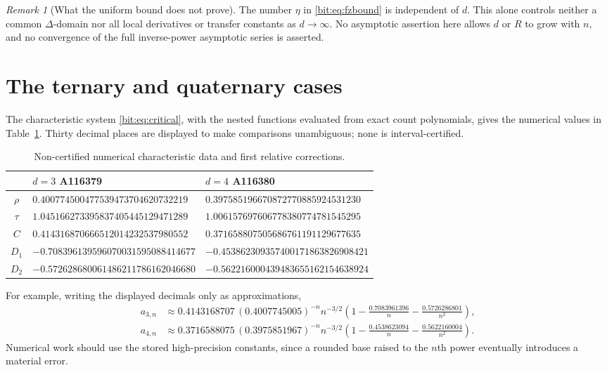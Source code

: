 \documentclass[11pt]{article}
\theoremstyle{definition}\newtheorem{definition}[theorem]{Definition}
\theoremstyle{remark}\newtheorem{remark}[theorem]{Remark}
\begin{document}
\begin{remark}[What the uniform bound does not prove]
The number $\eta$ in \eqref{bit:eq:fzbound} is independent of $d$. This alone controls neither a common $\Delta$-domain nor all local derivatives or transfer constants as $d\to\infty$. No asymptotic assertion here allows $d$ or $R$ to grow with $n$, and no convergence of the full inverse-power asymptotic series is asserted.
\end{remark}

\section{The ternary and quaternary cases}
\label{bit:sec:numerics}
The characteristic system \eqref{bit:eq:critical}, with the nested functions evaluated from exact count polynomials, gives the numerical values in Table~\ref{bit:tab:constants}. Thirty decimal places are displayed to make comparisons unambiguous; none is interval-certified.

\begin{table}[htbp]
\centering\small
\begin{tabular}{@{}cll@{}}
\toprule
 & $d=3$ \quad A116379 & $d=4$ \quad A116380\\
\midrule
$\rho$ & $0.400774500477539473704620732219$ & $0.397585196670872770885924531230$\\
$\tau$ & $1.045166273395837405445129471289$ & $1.006157697606778380774781545295$\\
$C$ & $0.414316870666512014232537980552$ & $0.371658807505686761191129677635$\\
$D_1$ & $-0.708396139596070031595088414677$ & $-0.453862309357400171863826908421$\\
$D_2$ & $-0.572628680061486211786162046680$ & $-0.562216000439483655162154638924$\\
\bottomrule
\end{tabular}
\caption{Non-certified numerical characteristic data and first relative corrections.}
\label{bit:tab:constants}
\end{table}

For example, writing the displayed decimals only as approximations,
\begin{align*}
 a_{3,n}&\approx0.4143168707\,(0.4007745005)^{-n}n^{-3/2}
 \left(1-\frac{0.7083961396}{n}-\frac{0.5726286801}{n^2}\right),\\
 a_{4,n}&\approx0.3716588075\,(0.3975851967)^{-n}n^{-3/2}
 \left(1-\frac{0.4538623094}{n}-\frac{0.5622160004}{n^2}\right).
\end{align*}
Numerical work should use the stored high-precision constants, since a rounded base raised to the $n$th power eventually introduces a material error.
\end{document}

